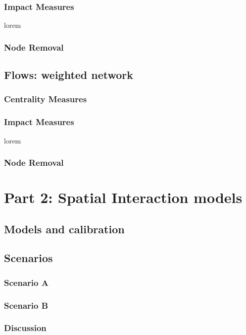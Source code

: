 \documentclass[10pt]{report}
\numberwithin{figure}{section}
\numberwithin{table}{section}
\begin{document}
\subsubsection{Impact Measures} 
lorem

\subsubsection{Node Removal} 

\subsection{Flows: weighted network} 

\subsubsection{Centrality Measures } 


\subsubsection{Impact Measures} 
lorem

\subsubsection{Node Removal} 

\section{ Part 2: Spatial Interaction models}


\subsection{Models and calibration}


\newpage
\subsection{Scenarios}
\subsubsection{Scenario A}
\subsubsection{Scenario B}
\subsubsection{Discussion}













\newpage
\printbibliography[title = {References}]
\end{document}
